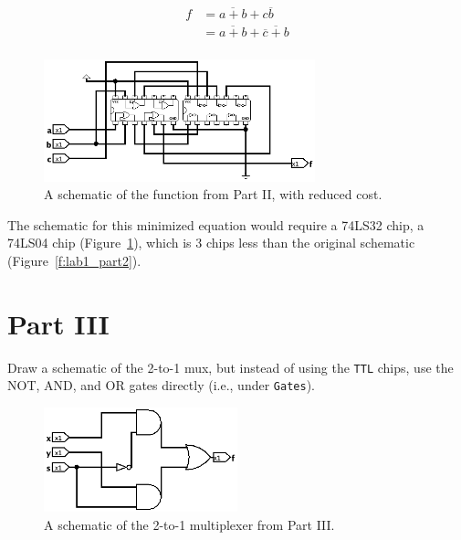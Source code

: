 \documentclass{article}
\begin{document}
\begin{enumerate}
    \begin{align*}
    f   &= \overline{a + b} + c\overline{b}\\
        &= \overline{a + b} + \overline{\overline{c} + b} \tag{De Morgan's Laws}\\
\end{align*}

\begin{figure}[!ht]
    \centering
    \includegraphics[width=0.7\textwidth]{lab1_part2_cheaper.png}
    \caption{A schematic of the function from Part II, with reduced cost.}
    \label{f:lab1_part2_cheaper}
\end{figure}
The schematic for this minimized equation would require a 74LS32 chip, a 74LS04 chip (Figure~\ref{f:lab1_part2_cheaper}), which is 3 chips less than the original schematic (Figure~\ref{f:lab1_part2}).

\end{enumerate}
\newpage
\section*{Part III}

Draw a schematic of the 2-to-1 mux, but instead of using the \verb|TTL| chips, use the NOT, AND, and OR gates directly (i.e., under \verb|Gates|).

\begin{figure}[!ht]
    \centering
    \includegraphics[width=0.5\textwidth]{lab1_part3.png}
    \caption{A schematic of the 2-to-1 multiplexer from Part III.}
    \label{f:lab1_part3}
\end{figure}
\end{document}
